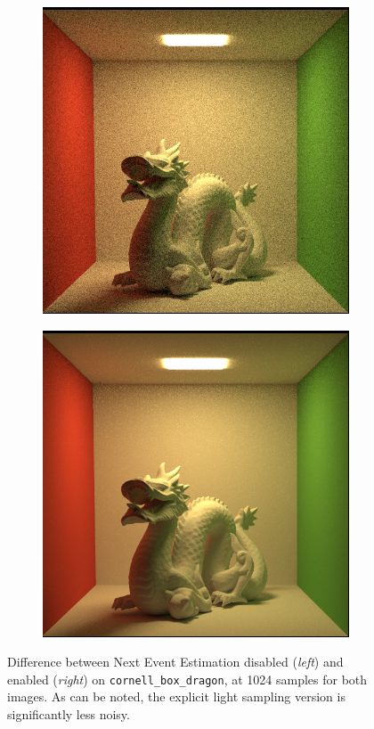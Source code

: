 \documentclass[12pt,a4paper]{article}
\begin{document}
\begin{figure}[h]
\centering
\begin{subfigure}{0.45\textwidth}
\centering
\includegraphics[width=\textwidth]{cornell_box_dragon_no_nee_1024.png}
\end{subfigure}
\hspace{0.4cm}
\begin{subfigure}{0.45\textwidth}
\centering
\includegraphics[width=\textwidth]{cornell_box_dragon_nee_1024.png}
\end{subfigure}
\caption{Difference between Next Event Estimation disabled (\textit{left}) and enabled (\textit{right}) on \texttt{cornell\_box\_dragon}, at 1024 samples for both images. As can be noted, the explicit light sampling version is significantly less noisy.}
\label{img:nee_comparison}
\end{figure}
\end{document}
